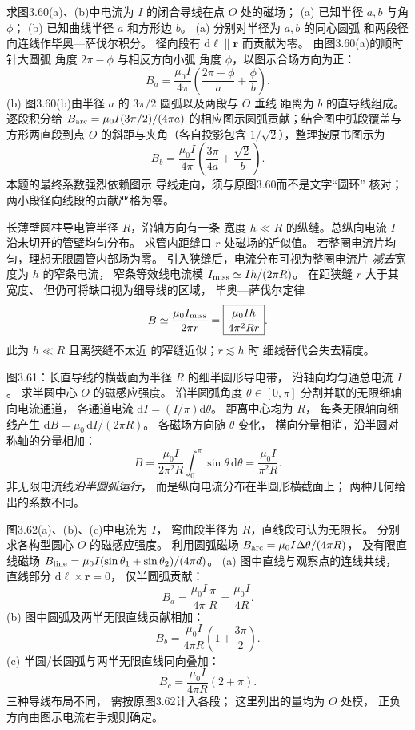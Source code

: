 求图3.60(a)、(b)中电流为 $I$
的闭合导线在点 $O$ 处的磁场；
(a) 已知半径 $a,b$ 与角 $\phi$；
(b) 已知曲线半径 $a$ 和方形边 $b$。
\exsolution
(a) 分别对半径为 $a,b$ 的同心圆弧
和两段径向连线作毕奥—萨伐尔积分。
径向段有
$\mathrm d\bm \ell\parallel\bm r$
而贡献为零。
由图3.60(a)的顺时针大圆弧
角度 $2\pi-\phi$ 与相反方向小弧
角度 $\phi$，以图示合场方向为正：
\[
\boxed{B_a=\frac{\mu_0I}{4\pi}
\left(\frac{2\pi-\phi}{a}+\frac{\phi}{b}\right)}.
\]
(b) 图3.60(b)由半径 $a$
的 $3\pi/2$ 圆弧以及两段与 $O$ 垂线
距离为 $b$ 的直导线组成。
逐段积分给
$B_{\rm arc}=\mu_0I(3\pi/2)/(4\pi a)$
的相应图示圆弧贡献；结合图中弧段覆盖与
方形两直段到点 $O$ 的斜距与夹角（各自投影包含 $1/\sqrt2$），整理按原书图示为
\[
\boxed{B_b=\frac{\mu_0I}{4\pi}
\left(\frac{3\pi}{4a}+\frac{\sqrt2}{b}\right)}.
\]
\excheck 本题的最终系数强烈依赖图示
导线走向，须与原图3.60而不是文字“圆环”
核对；两小段径向线段的贡献严格为零。

长薄壁圆柱导电管半径 $R$，沿轴方向有一条
宽度 $h\ll R$ 的纵缝。总纵向电流 $I$
沿未切开的管壁均匀分布。
求管内距缝口 $r$ 处磁场的近似值。
\exsolution
若整圈电流片均匀，理想无限圆管内部场为零。
引入狭缝后，电流分布可视为整圈电流片
\emph{减去}宽度为 $h$ 的窄条电流，
窄条等效线电流模
$I_{\rm miss}\simeq Ih/(2\pi R)$。
在距狭缝 $r$ 大于其宽度、
但仍可将缺口视为细导线的区域，
毕奥—萨伐尔定律
\[
B\simeq\frac{\mu_0I_{\rm miss}}{2\pi r}
=\boxed{\frac{\mu_0Ih}{4\pi^2Rr}}.
\]
\excheck 此为 $h\ll R$ 且离狭缝不太近
的窄缝近似；$r\lesssim h$ 时
细线替代会失去精度。

图3.61：长直导线的横截面为半径 $R$
的细半圆形导电带，
沿轴向均匀通总电流 $I$。
求半圆中心 $O$ 的磁感应强度。
\exsolution
沿半圆弧角度 $\theta\in[0,\pi]$
分割并联的无限细轴向电流通道，
各通道电流 $\mathrm dI=(I/\pi)\mathrm d\theta$。
距离中心均为 $R$，
每条无限轴向细线产生
$\mathrm dB=\mu_0\,\mathrm dI/(2\pi R)$。
各磁场方向随 $\theta$ 变化，
横向分量相消，沿半圆对称轴的分量相加：
\[
B=\frac{\mu_0I}{2\pi^2R}
\int_0^\pi\sin\theta\,\mathrm d\theta
=\boxed{\frac{\mu_0I}{\pi^2R}}.
\]
\excheck 非无限电流线\emph{沿半圆弧运行}，
而是纵向电流分布在半圆形横截面上；
两种几何给出的系数不同。

图3.62(a)、(b)、(c)中电流为 $I$，
弯曲段半径为 $R$，直线段可认为无限长。
分别求各构型圆心 $O$ 的磁感应强度。
\exsolution
利用圆弧磁场
$B_{\rm arc}=\mu_0I\Delta\theta/(4\pi R)$，
及有限直线磁场
$B_{\rm line}=\mu_0I(\sin\theta_1+
\sin\theta_2)/(4\pi d)$。
(a) 图中直线与观察点的连线共线，
直线部分 $\mathrm d\bm\ell\times\bm r=0$，
仅半圆弧贡献：
\[
\boxed{B_a=\frac{\mu_0I}{4\pi}\frac{\pi}{R}
=\frac{\mu_0I}{4R}}.
\]
(b) 图中圆弧及两半无限直线贡献相加：
\[
\boxed{B_b=\frac{\mu_0I}{4\pi R}
\left(1+\frac{3\pi}{2}\right)}.
\]
(c) 半圆/长圆弧与两半无限直线同向叠加：
\[
\boxed{B_c=\frac{\mu_0I}{4\pi R}
(2+\pi)}.
\]
\excheck 三种导线布局不同，
需按原图3.62计入各段；
这里列出的量均为 $O$ 处模，
正负方向由图示电流右手规则确定。

